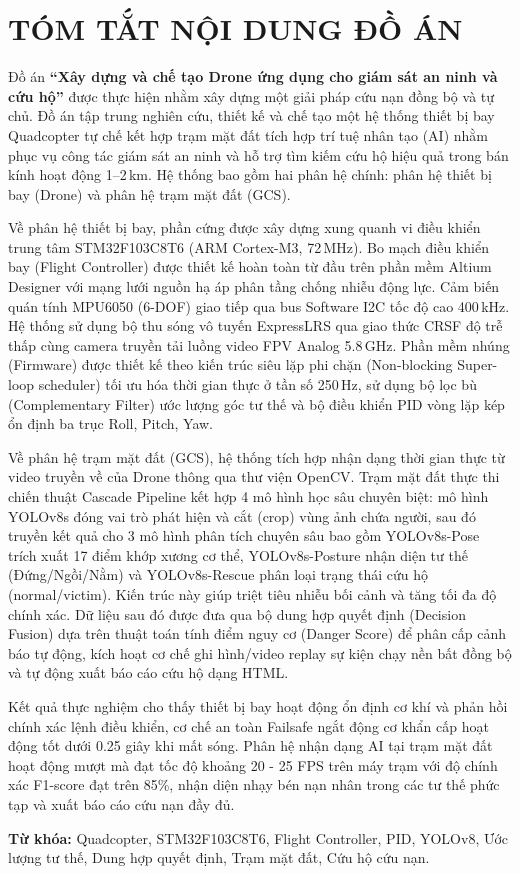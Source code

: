 \section*{TÓM TẮT NỘI DUNG ĐỒ ÁN}
\thispagestyle{empty}

Đồ án \textbf{``Xây dựng và chế tạo Drone ứng dụng cho giám sát an ninh và cứu hộ''} được thực hiện nhằm xây dựng một giải pháp cứu nạn đồng bộ và tự chủ. Đồ án tập trung nghiên cứu, thiết kế và chế tạo một hệ thống thiết bị bay Quadcopter tự chế kết hợp trạm mặt đất tích hợp trí tuệ nhân tạo (AI) nhằm phục vụ công tác giám sát an ninh và hỗ trợ tìm kiếm cứu hộ hiệu quả trong bán kính hoạt động 1--2\,km. Hệ thống bao gồm hai phân hệ chính: phân hệ thiết bị bay (Drone) và phân hệ trạm mặt đất (GCS).

Về phân hệ thiết bị bay, phần cứng được xây dựng xung quanh vi điều khiển trung tâm STM32F103C8T6 (ARM Cortex-M3, 72\,MHz). Bo mạch điều khiển bay (Flight Controller) được thiết kế hoàn toàn từ đầu trên phần mềm Altium Designer với mạng lưới nguồn hạ áp phân tầng chống nhiễu động lực. Cảm biến quán tính MPU6050 (6-DOF) giao tiếp qua bus Software I2C tốc độ cao 400\,kHz. Hệ thống sử dụng bộ thu sóng vô tuyến ExpressLRS qua giao thức CRSF độ trễ thấp cùng camera truyền tải luồng video FPV Analog 5.8\,GHz. Phần mềm nhúng (Firmware) được thiết kế theo kiến trúc siêu lặp phi chặn (Non-blocking Super-loop scheduler) tối ưu hóa thời gian thực ở tần số 250\,Hz, sử dụng bộ lọc bù (Complementary Filter) ước lượng góc tư thế và bộ điều khiển PID vòng lặp kép ổn định ba trục Roll, Pitch, Yaw.

Về phân hệ trạm mặt đất (GCS), hệ thống tích hợp nhận dạng thời gian thực từ video truyền về của Drone thông qua thư viện OpenCV. Trạm mặt đất thực thi chiến thuật Cascade Pipeline kết hợp 4 mô hình học sâu chuyên biệt: mô hình YOLOv8s đóng vai trò phát hiện và cắt (crop) vùng ảnh chứa người, sau đó truyền kết quả cho 3 mô hình phân tích chuyên sâu bao gồm YOLOv8s-Pose trích xuất 17 điểm khớp xương cơ thể, YOLOv8s-Posture nhận diện tư thế (Đứng/Ngồi/Nằm) và YOLOv8s-Rescue phân loại trạng thái cứu hộ (normal/victim). Kiến trúc này giúp triệt tiêu nhiễu bối cảnh và tăng tối đa độ chính xác. Dữ liệu sau đó được đưa qua bộ dung hợp quyết định (Decision Fusion) dựa trên thuật toán tính điểm nguy cơ (Danger Score) để phân cấp cảnh báo tự động, kích hoạt cơ chế ghi hình/video replay sự kiện chạy nền bất đồng bộ và tự động xuất báo cáo cứu hộ dạng HTML.

Kết quả thực nghiệm cho thấy thiết bị bay hoạt động ổn định cơ khí và phản hồi chính xác lệnh điều khiển, cơ chế an toàn Failsafe ngắt động cơ khẩn cấp hoạt động tốt dưới 0.25 giây khi mất sóng. Phân hệ nhận dạng AI tại trạm mặt đất hoạt động mượt mà đạt tốc độ khoảng 20 - 25 FPS trên máy trạm với độ chính xác F1-score đạt trên 85\%, nhận diện nhạy bén nạn nhân trong các tư thế phức tạp và xuất báo cáo cứu nạn đầy đủ.

\vspace{6pt}
\noindent\textbf{Từ khóa:} Quadcopter, STM32F103C8T6, Flight Controller, PID, YOLOv8, Ước lượng tư thế, Dung hợp quyết định, Trạm mặt đất, Cứu hộ cứu nạn.
\cleardoublepage

